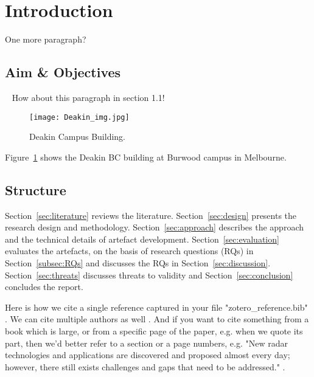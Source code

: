 \section{Introduction}
\label{sec:introduction}
One more paragraph?

\subsection{Aim \& Objectives}~\label{subsec:aims}
How about this paragraph in section 1.1!
\begin{figure}[h]
    \centering
    \texttt{[image: Deakin\_img.jpg]}
    \caption{Deakin Campus Building.}
    \label{fig:building}
\end{figure}

Figure~\ref{fig:building} shows the Deakin BC building at Burwood campus in Melbourne.

\subsection{Structure}\label{subsec:structure}
Section~\ref{sec:literature} reviews the literature. Section~\ref{sec:design} presents the research design and methodology. Section~\ref{sec:approach} describes the approach and the technical details of artefact development. Section~\ref{sec:evaluation} evaluates the artefacts, on the basis of research questions (RQs) in Section~\ref{subsec:RQs} and discusses the RQs in Section~\ref{sec:discussion}. Section~\ref{sec:threats} discusses threats to validity and Section~\ref{sec:conclusion} concludes the report. 

Here is how we cite a single reference captured in your file "zotero\_reference.bib" \cite{gameiro_research_2018}. We can cite multiple authors as well \cite{skolnik_radar_2008,the_joint_board_on_scientific_information_policy_radar_1945}. And if you want to cite something from a book which is large, or from a specific page of the paper, e.g. when we quote its part, then we'd better refer to  a section or a page numbers, e.g. "New radar technologies and applications are discovered and proposed almost every day; however, there still exists challenges and gaps that need to be addressed." \cite[p4]{stimson_introduction_1998}.
